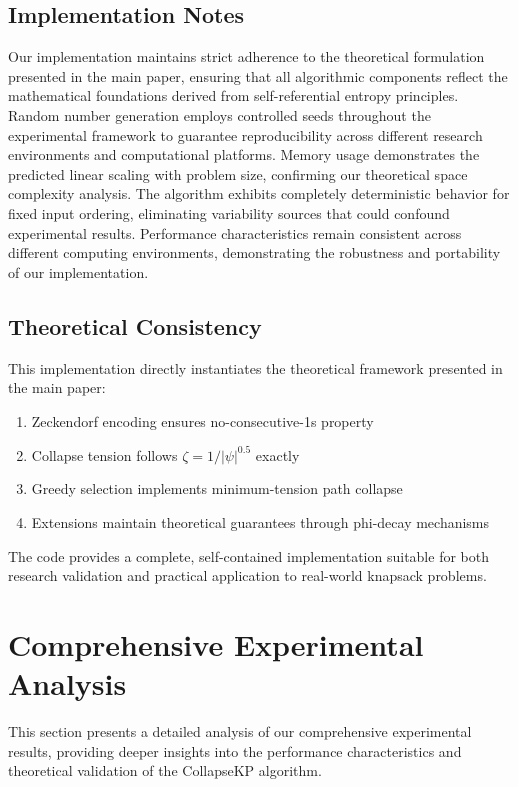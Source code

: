 \documentclass[11pt]{article}
\theoremstyle{remark}
\theoremstyle{definition}
\begin{document}
\subsection{Implementation Notes}

Our implementation maintains strict adherence to the theoretical formulation presented in the main paper, ensuring that all algorithmic components reflect the mathematical foundations derived from self-referential entropy principles. Random number generation employs controlled seeds throughout the experimental framework to guarantee reproducibility across different research environments and computational platforms. Memory usage demonstrates the predicted linear scaling with problem size, confirming our theoretical space complexity analysis. The algorithm exhibits completely deterministic behavior for fixed input ordering, eliminating variability sources that could confound experimental results. Performance characteristics remain consistent across different computing environments, demonstrating the robustness and portability of our implementation.

\subsection{Theoretical Consistency}

This implementation directly instantiates the theoretical framework presented in the main paper:
\begin{enumerate}
\item Zeckendorf encoding ensures no-consecutive-1s property
\item Collapse tension follows $\zeta = 1/|\psi|^{0.5}$ exactly
\item Greedy selection implements minimum-tension path collapse
\item Extensions maintain theoretical guarantees through phi-decay mechanisms
\end{enumerate}

The code provides a complete, self-contained implementation suitable for both research validation and practical application to real-world knapsack problems.

\section{Comprehensive Experimental Analysis}
\label{app:comprehensive-analysis}

This section presents a detailed analysis of our comprehensive experimental results, providing deeper insights into the performance characteristics and theoretical validation of the CollapseKP algorithm.
\end{document}
